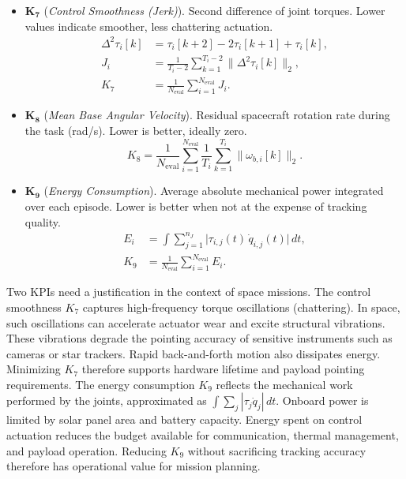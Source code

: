 \documentclass{ieeeaccess}
\begin{document}
\begin{itemize}
  \item $\boldsymbol{K_7}$ (\emph{Control Smoothness (Jerk)}). Second difference of joint torques. Lower
  values indicate smoother, less chattering actuation.
  \begin{equation*}
  \begin{aligned}
  \Delta^2\tau_i[k] &= \tau_i[k+2]-2\tau_i[k+1]+\tau_i[k],\\
  J_i &= \frac{1}{T_i-2}\sum_{k=1}^{T_i-2}\|\Delta^2\tau_i[k]\|_2,\\
  K_7 &= \frac{1}{N_{\mathrm{eval}}}\sum_{i=1}^{N_{\mathrm{eval}}}J_i.
  \end{aligned}
  \end{equation*}

  \item $\boldsymbol{K_8}$ (\emph{Mean Base Angular Velocity}). Residual spacecraft rotation rate during
  the task (rad/s). Lower is better, ideally zero.
  \begin{equation*}
  K_8=\frac{1}{N_{\mathrm{eval}}}\sum_{i=1}^{N_{\mathrm{eval}}}\frac{1}{T_i}\sum_{k=1}^{T_i}\|\omega_{b,i}[k]\|_2.
  \end{equation*}

  \item $\boldsymbol{K_9}$ (\emph{Energy Consumption}). Average absolute mechanical power integrated over
  each episode. Lower is better when not at the expense of tracking quality.
  \begin{equation*}
  \begin{aligned}
  E_i &= \int\sum_{j=1}^{n_J}\big|\tau_{i,j}(t)\,\dot q_{i,j}(t)\big|\,dt,\\
  K_9 &= \frac{1}{N_{\mathrm{eval}}}\sum_{i=1}^{N_{\mathrm{eval}}} E_i.
  \end{aligned}
  \end{equation*}
\end{itemize}


Two KPIs need a justification in the context of space missions. The control smoothness $K_7$ captures
high-frequency torque oscillations (chattering). In space, such oscillations can accelerate actuator wear
and excite structural vibrations. These vibrations degrade the pointing accuracy of sensitive instruments
such as cameras or star trackers. Rapid back-and-forth motion also dissipates energy. Minimizing $K_7$
therefore supports hardware lifetime and payload pointing requirements. The energy consumption $K_9$
reflects the mechanical work performed by the joints, approximated as
$\int \sum_j |\tau_j \dot{q}_j|\,dt$. Onboard power is limited by solar panel area and battery capacity.
Energy spent on control actuation reduces the budget available for communication, thermal management, and
payload operation. Reducing $K_9$ without sacrificing tracking accuracy therefore has operational value
for mission planning.
\end{document}
